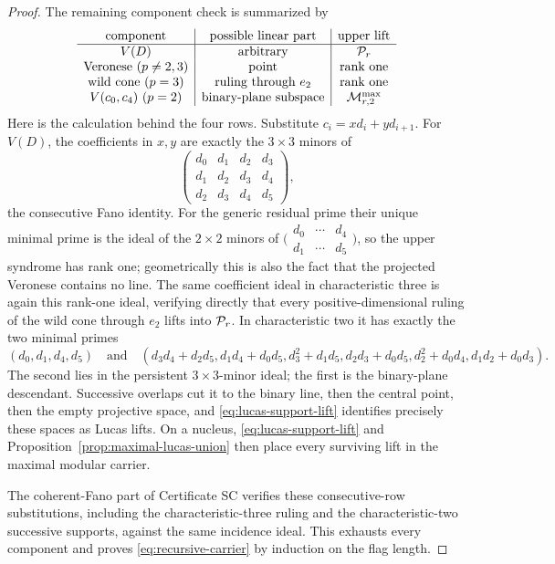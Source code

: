 \begin{proof}
The remaining component check is summarized by
\[
\begin{array}{c|c|c}
\text{component}&\text{possible linear part}&\text{upper lift}\\ \hline
V(D)&\text{arbitrary}&\mathcal P_r\\
\text{Veronese }(p\ne2,3)&\text{point}&\text{rank one}\\
\text{wild cone }(p=3)&\text{ruling through }e_2&\text{rank one}\\
V(c_0,c_4)\ (p=2)&\text{binary-plane subspace}&
   \mathcal M^{\max}_{r,2}
\end{array}
\]
Here is the calculation behind the four rows.  Substitute
\(c_i=xd_i+yd_{i+1}\).  For \(V(D)\), the coefficients in \(x,y\) are
exactly the \(3\times3\) minors of
\[
 \begin{pmatrix}d_0&d_1&d_2&d_3\\d_1&d_2&d_3&d_4\\
 d_2&d_3&d_4&d_5\end{pmatrix},
\]
the consecutive Fano identity.  For the generic residual prime their unique
minimal prime is the ideal of the \(2\times2\) minors of
\(\bigl(\begin{smallmatrix}d_0&\cdots&d_4\\d_1&\cdots&d_5\end{smallmatrix}\bigr)\),
so the upper syndrome has rank one; geometrically this is also the fact that
the projected Veronese contains no line.  The same coefficient ideal in
characteristic three is again this rank-one ideal, verifying directly that
every positive-dimensional ruling of the wild cone through \(e_2\) lifts
into \(\mathcal P_r\).  In characteristic two it has exactly the two minimal primes
\[
 (d_0,d_1,d_4,d_5)
 \quad\text{and}\quad
 (d_3d_4+d_2d_5,d_1d_4+d_0d_5,d_3^2+d_1d_5,
 d_2d_3+d_0d_5,d_2^2+d_0d_4,d_1d_2+d_0d_3).
\]
The second lies in the persistent \(3\times3\)-minor ideal; the first is the
binary-plane descendant.  Successive overlaps cut it to the binary line,
then the central point, then the empty projective space, and
\eqref{eq:lucas-support-lift} identifies precisely these spaces as Lucas
lifts.  On a nucleus, \eqref{eq:lucas-support-lift} and
Proposition~\ref{prop:maximal-lucas-union} then place every surviving lift in
the maximal modular carrier.

The coherent-Fano part of Certificate SC verifies these consecutive-row
substitutions, including the characteristic-three ruling and the
characteristic-two successive supports, against the same incidence ideal.
This exhausts every component and proves \eqref{eq:recursive-carrier} by
induction on the flag length.
\end{proof}

